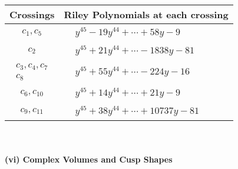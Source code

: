 \documentclass[1p]{elsarticle_modified}
\theoremstyle{definition}
\begin{document}
\begin{tabular}{m{50pt}|m{274pt}}
Crossings & \hspace{64pt}Riley Polynomials at each crossing \\
\hline $$\begin{aligned}c_{1},c_{5}\end{aligned}$$&$\begin{aligned}
&y^{45}-19 y^{44}+\cdots+58 y-9
\end{aligned}$\\
\hline $$\begin{aligned}c_{2}\end{aligned}$$&$\begin{aligned}
&y^{45}+21 y^{44}+\cdots-1838 y-81
\end{aligned}$\\
\hline $$\begin{aligned}c_{3},c_{4},c_{7}\\c_{8}\end{aligned}$$&$\begin{aligned}
&y^{45}+55 y^{44}+\cdots-224 y-16
\end{aligned}$\\
\hline $$\begin{aligned}c_{6},c_{10}\end{aligned}$$&$\begin{aligned}
&y^{45}+14 y^{44}+\cdots+21 y-9
\end{aligned}$\\
\hline $$\begin{aligned}c_{9},c_{11}\end{aligned}$$&$\begin{aligned}
&y^{45}+38 y^{44}+\cdots+10737 y-81
\end{aligned}$\\
\hline
\end{tabular}\\~\\
\newpage\flushleft \textbf{(vi) Complex Volumes and Cusp Shapes}
\end{document}
